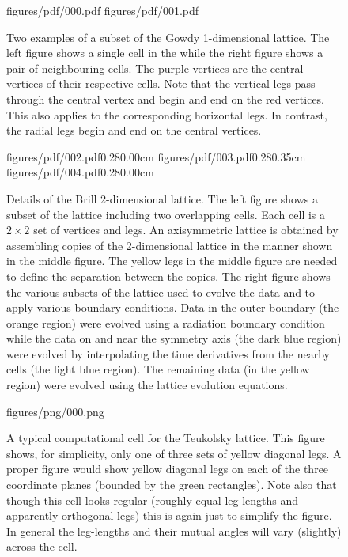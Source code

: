 \documentclass[a4paper,12pt]{article}
\numberwithin{equation}{section}
\begin{document}
\begin{figure}[!ht]
\FigPair%
{figures/pdf/000.pdf}{\mywd}%
{figures/pdf/001.pdf}{\mywd}
\caption{Two examples of a subset of the Gowdy 1-dimensional lattice. The
left figure shows a single cell in the while the right figure shows a pair of
neighbouring cells. The purple vertices are the central vertices of their
respective cells. Note that the vertical legs pass through the central vertex
and begin and end on the red vertices. This also applies to the corresponding
horizontal legs. In contrast, the radial legs begin and end on the central
vertices.}
\label{fig:GowdyLattice}
\end{figure}

\begin{figure}[!ht]
\FigTripleAlt%
{figures/pdf/002.pdf}{0.28}{0.00cm}%
{figures/pdf/003.pdf}{0.28}{0.35cm}%
{figures/pdf/004.pdf}{0.28}{0.00cm}
\caption{Details of the Brill 2-dimensional lattice. The left figure shows a
subset of the lattice including two overlapping cells. Each cell is a
$2\times2$ set of vertices and legs. An axisymmetric lattice is obtained by
assembling copies of the 2-dimensional lattice in the manner shown in the
middle figure. The yellow legs in the middle figure are needed to define the
separation between the copies. The right figure shows the various subsets of
the lattice used to evolve the data and to apply various boundary conditions.
Data in the outer boundary (the orange region) were evolved using a radiation
boundary condition while the data on and near the symmetry axis (the dark
blue region) were evolved by interpolating the time derivatives from the
nearby cells (the light blue region). The remaining data (in the yellow
region) were evolved using the lattice evolution equations.}
\label{fig:BrillLattice}
\end{figure}

\begin{figure}[!ht]
\Figure%
{figures/png/000.png}{\mywd}%
\caption{A typical computational cell for the Teukolsky lattice. This figure
shows, for simplicity, only one of three sets of yellow diagonal legs. A
proper figure would show yellow diagonal legs on each of the three coordinate
planes (bounded by the green rectangles). Note also that though this cell
looks regular (roughly equal leg-lengths and apparently orthogonal legs)
this is again just to simplify the figure. In general the leg-lengths and
their mutual angles will vary (slightly) across the cell.}
\label{fig:TeukolskyLattice}
\end{figure}
\end{document}
